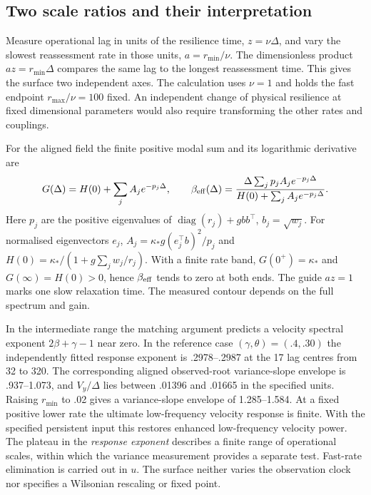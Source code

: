 \documentclass[11pt]{article}
\begin{document}
\subsection{Two scale ratios and their interpretation}
Measure operational lag in units of the resilience time, \(z=\nu\Delta\),
and vary the slowest reassessment rate in those units,
\(a=r_{\min}/\nu\). The dimensionless product \(az=r_{\min}\Delta\)
compares the same lag to the longest reassessment time. This gives the
surface two independent axes. The calculation uses \(\nu=1\) and holds the
fast endpoint \(r_{\max}/\nu=100\) fixed. An independent change of physical
resilience at fixed dimensional parameters would also require transforming
the other rates and couplings.

For the aligned field the finite positive modal sum and its logarithmic
derivative are
\begin{equation}
 G(\Delta)=H(0)+\sum_j A_j e^{-p_j\Delta},\qquad
 \beta_{\rm eff}(\Delta)=
 \frac{\Delta\sum_j p_j A_j e^{-p_j\Delta}}
      {H(0)+\sum_j A_j e^{-p_j\Delta}} .
 \label{eq:window-beta}
\end{equation}
Here \(p_j\) are the positive eigenvalues of
\(\operatorname{diag}(r_j)+g b b^\top\), \(b_j=\sqrt{w_j}\).
For normalised eigenvectors \(e_j\), \(A_j=\kappa_*g(e_j^\top b)^2/p_j\)
and \(H(0)=\kappa_*/(1+g\sum_j w_j/r_j)\). With a finite rate band,
\(G(0^+)=\kappa_*\) and \(G(\infty)=H(0)>0\), hence \(\beta_{\rm eff}\)
tends to zero at both ends. The guide \(az=1\) marks one slow relaxation
time. The measured contour depends on the full spectrum and gain.

In the intermediate range the matching argument predicts a velocity
spectral exponent \(2\beta+\gamma-1\) near zero. In the reference
case \((\gamma,\theta)=(.4,.30)\) the independently fitted response
exponent is .2978--.2987 at the 17 lag centres from 32 to 320.
The corresponding aligned observed-root variance-slope envelope is
.937--1.073, and \(V_y/\Delta\) lies between .01396 and .01665 in the
specified units. Raising \(r_{\min}\) to .02 gives a variance-slope
envelope of 1.285--1.584. At a fixed positive lower rate the ultimate
low-frequency velocity response is finite. With the specified persistent
input this restores enhanced low-frequency velocity power. The plateau
in the \emph{response exponent} describes a finite range of operational
scales, within which the variance measurement provides a separate test.
Fast-rate elimination is carried out in \(u\). The surface neither varies
the observation clock nor specifies a Wilsonian rescaling or fixed point.
\end{document}
